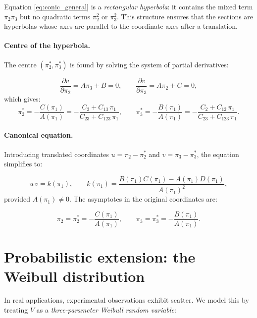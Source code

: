 Equation \eqref{eq:conic_general} is a \emph{rectangular hyperbola}: it contains the mixed term \(\pi_2\pi_3\) but no quadratic terms \(\pi_2^2\) or \(\pi_3^2\). This structure ensures that the sections are hyperbolas whose axes are parallel to the coordinate axes after a translation.

\paragraph{Centre of the hyperbola.}
The centre \((\pi_2^*, \pi_3^*)\) is found by solving the system of partial derivatives:

\begin{equation}\label{eq:center_conditions}
\frac{\partial v}{\partial \pi_2} = A\pi_3 + B = 0,\qquad
\frac{\partial v}{\partial \pi_3} = A\pi_2 + C = 0,
\end{equation}
which gives:
\begin{equation}\label{eq:center}
\boxed{
\pi_2^* = -\frac{C(\pi_1)}{A(\pi_1)} = -\frac{C_3 + C_{13}\,\pi_1}{C_{23} + C_{123}\,\pi_1},\qquad
\pi_3^* = -\frac{B(\pi_1)}{A(\pi_1)} = -\frac{C_2 + C_{12}\,\pi_1}{C_{23} + C_{123}\,\pi_1}.
}
\end{equation}

\paragraph{Canonical equation.}
Introducing translated coordinates \(u = \pi_2 - \pi_2^*\) and \(v = \pi_3 - \pi_3^*\), the equation simplifies to:

\begin{equation}\label{eq:canonical_general}
\boxed{
u\,v = k(\pi_1),\qquad
k(\pi_1) = \frac{B(\pi_1)C(\pi_1)-A(\pi_1)D(\pi_1)}{A(\pi_1)^2},
}
\end{equation}
provided \(A(\pi_1) \neq 0\). The asymptotes in the original coordinates are:

\begin{equation}\label{eq:asymptotes_general}
\boxed{
\pi_2 = \pi_2^* = -\frac{C(\pi_1)}{A(\pi_1)},\qquad
\pi_3 = \pi_3^* = -\frac{B(\pi_1)}{A(\pi_1)}.
}
\end{equation}

\section{Probabilistic extension: the Weibull distribution}
\label{sec:probabilistic-weibull}

In real applications, experimental observations exhibit scatter. We model this by treating \(V\) as a \emph{three‑parameter Weibull random variable}:

